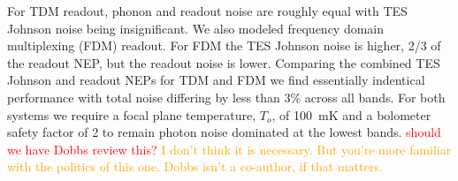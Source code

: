 \documentclass[]{spie}  %
\newcommand{\comr}[1]{\textcolor{red}{#1}}
\newcommand{\como}[1]{\textcolor{orange}{#1}}
\begin{document}
For TDM readout, phonon and readout noise are roughly equal with TES Johnson noise being insignificant.  We also modeled 
frequency domain multiplexing (FDM) readout.  For FDM the TES Johnson noise is higher, 2/3 of the readout NEP, but the readout 
noise is lower.  Comparing the combined TES Johnson and readout NEPs for TDM and FDM we find essentially indentical performance 
with total noise differing by less than 3\% across all bands.  For both systems we require a focal plane temperature, $T_o$, of 
100~mK and a bolometer safety factor of 2 to remain photon noise dominated at the lowest bands. 
\comr{should we have Dobbs review this?} \como{I don't think it is necessary. But you're more familiar with the politics of this one. Dobbs isn't a co-author, if that matters.}



\end{document}
